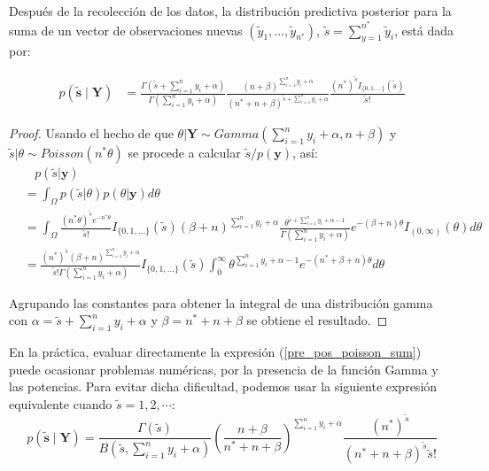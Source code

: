 \documentclass[10pt,openright]{book}\usepackage[]{graphicx}\usepackage[]{color}
\begin{document}
    \begin{Res}
    Despu\'es de la recolecci\'on de los datos, la distribuci\'on predictiva posterior para la suma de un vector de observaciones nuevas $\left(\tilde{y}_1,\ldots,\tilde{y}_{n^*}\right)$, $\tilde{s} = \sum_{y=1}^{n^*} \tilde{y}_i$, est\'a dada por:
    
    \begin{align}\label{pre_pos_poisson_sum}
    p(\tilde{\mathbf{s}} \mid \mathbf{Y})&=\frac{\Gamma(\tilde{s}+\sum_{i=1}^ny_i+\alpha)}{\Gamma(\sum_{i=1}^ny_i+\alpha)}
    \frac{(n+\beta)^{\sum_{i=1}^ny_i+\alpha}}{({n^*}+n+\beta)^{\tilde{s}+\sum_{i=1}^ny_i+\alpha}}\frac{(n^*)^{\tilde{s}}I_{\{0,1,\ldots\}}(\tilde{s})}{\tilde{s}!}
    \end{align}
    \end{Res}
    
    \begin{proof}
    Usando el hecho de que $\theta|\mathbf{Y}\sim Gamma(\sum_{i=1}^{n}y_i+\alpha,n+\beta)$ y $\tilde{s}|\theta\sim Poisson(n^*\theta)$ se procede a calcular $\tilde{s}/p(\mathbf{y})$,
    as\'i:
    \begin{align*}
    &\ \ \ \ p(\tilde{s}|\mathbf{y}) \\
    &= \int_{\Omega} p(\tilde{s}|\theta)p(\theta|\mathbf{y})d\theta\\
    & = \int_{\Omega} \frac{(n^{*}\theta)^{\tilde{s}}e^{-n^*\theta}}{\tilde{s}!} I_{\{0,1,\ldots\}}(\tilde{s}) (\beta+n)^{\sum_{i=1}^{n}y_i+\alpha}\frac{\theta^{\tilde{s}+\sum_{i=1}^{n}y_i+\alpha-1}}{\Gamma(\sum_{i=1}^{n}y_i+\alpha)}e^{-(\beta+n)\theta}I_{(0,\infty)}(\theta) d\theta\\
    &= \frac{(n^*)^{\tilde{s}}(\beta+n)^{\sum_{i=1}^{n}y_i+\alpha}}{\tilde{s}!\Gamma(\sum_{i=1}^{n}y_i+\alpha)}I_{\{0,1,\ldots\}}(\tilde{s})\int_{0}^{\infty}\theta^{\sum_{i=1}^{n}y_i+\alpha-1}e^{-(n^*+\beta+n)\theta}d\theta
    \end{align*}
    
    Agrupando las constantes para obtener la integral de una distribuci\'on gamma con $\alpha=\tilde{s}+\sum_{i=1}^{n}y_i+\alpha$ y $\beta=n^*+n+\beta$ se obtiene el resultado.
    \end{proof}
    
    En la pr\'actica, evaluar directamente la expresi\'on (\ref{pre_pos_poisson_sum}) puede ocasionar problemas num\'ericas, por la presencia de la funci\'on Gamma y las potencias. Para evitar dicha dificultad, podemos usar la siguiente expresi\'on equivalente cuando $\tilde{s}=1,2,\cdots$: 
    \begin{equation*}
    p(\tilde{\mathbf{s}} \mid \mathbf{Y})=\frac{\Gamma(\tilde{s})}{B(\tilde{s},\sum_{i=1}^ny_i+\alpha)}
    \left(\frac{n+\beta}{n^*+n+\beta}\right)^{\sum_{i=1}^ny_i+\alpha}\frac{(n^*)^{\tilde{s}}}{(n^*+n+\beta)^{\tilde{s}}\tilde{s}!}
    \end{equation*}
    
\end{document}
